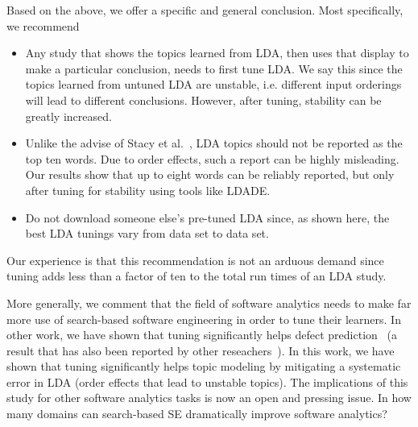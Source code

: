\documentclass[10pt,conference]{IEEEtran}
\newcommand{\bi}{\begin{itemize}}
\newcommand{\ei}{\end{itemize}}
\theoremstyle{break}
\begin{document}
Based on the above, we offer a specific and general conclusion. Most specifically, we recommend 
\bi
\item  
Any study that shows the topics learned from LDA, then uses that display to make a particular
conclusion, needs to first tune LDA. We say this since the topics learned from untuned LDA are unstable, i.e. different input orderings will lead to different conclusions.
However, after tuning, stability can be greatly increased.
\item Unlike the advise of Stacy et al.~\cite{lukins2010bug}, LDA topics should not be reported as the top ten words.
  Due to order effects, such a report can be highly misleading.
  Our results show that up to eight words can be reliably reported, but only
  after tuning for stability using tools like LDADE.
\item Do not download someone else's pre-tuned LDA since, as shown here,  the best LDA tunings vary from data set to data set.
\ei
Our experience is that this recommendation is not an arduous demand since tuning adds less than a factor of ten to the total run times of an LDA study.


More generally, we comment that the field of software analytics needs to make far more use of search-based software engineering in order
to tune their learners. In other work, we have shown that tuning significantly helps defect prediction~\cite{fu2016tuning} (a result that has also been reported by
other reseachers~\cite{panichella2013effectively}). In this work, we have shown that tuning significantly helps topic modeling by mitigating a systematic error in LDA  (order effects that lead to unstable topics). The implications of this study for other software analytics tasks is now an open
and pressing issue. 
In how many domains can search-based SE dramatically improve software analytics?





\medskip



\end{document}
